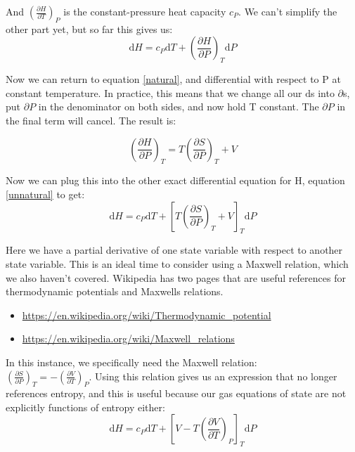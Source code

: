 \documentclass[12pt,letterpaper]{article}
\begin{document}
	And $\left(\frac{\partial H}{\partial T}\right)_P$ is the constant-pressure heat capacity $c_P$. We can't simplify the other part yet, but so far this gives us:
	\begin{equation}\label{unnatural}
		\mathrm{d}H=c_P\mathrm{d}T + \left(\frac{\partial H}{\partial P}\right)_T\mathrm{d}P
	\end{equation}

	Now we can return to equation \ref{natural}, and differential with respect to P at constant temperature. In practice, this means that we change all our $\mathrm{d}$s into $\partial$s, put $\partial P$ in the denominator on both sides, and now hold T constant. The $\partial P$ in the final term will cancel. The result is:
	
	\begin{equation}
		\left(\frac{\partial H}{\partial P}\right)_T = T \left(\frac{\partial S}{\partial P}\right)_T + V
	\end{equation}

	Now we can plug this into the other exact differential equation for H, equation \ref{unnatural} to get:
	\begin{equation}
		\mathrm{d}H=c_P\mathrm{d}T + \left[T \left(\frac{\partial S}{\partial P}\right)_T + V\right]_T\mathrm{d}P
	\end{equation}

	Here we have a partial derivative of one state variable with respect to another state variable. This is an ideal time to consider using a Maxwell relation, which we also haven't covered. Wikipedia has two pages that are useful references for thermodynamic potentials and Maxwells relations.
	\begin{itemize}
		\item \href{https://en.wikipedia.org/wiki/Thermodynamic_potential}{https://en.wikipedia.org/wiki/Thermodynamic\_potential}
		\item \href{https://en.wikipedia.org/wiki/Maxwell_relations}{https://en.wikipedia.org/wiki/Maxwell\_relations}
	\end{itemize}

	In this instance, we specifically need the Maxwell relation:\\ $\left(\frac{\partial S}{\partial P}\right)_T = - \left(\frac{\partial V}{\partial T}\right)_P$. Using this relation gives us an expression that no longer references entropy, and this is useful because our gas equations of state are not explicitly functions of entropy either:
	\begin{equation}
		\mathrm{d}H=c_P\mathrm{d}T + \left[V-T \left(\frac{\partial V}{\partial T}\right)_P\right]_T\mathrm{d}P
	\end{equation}
\end{document}
